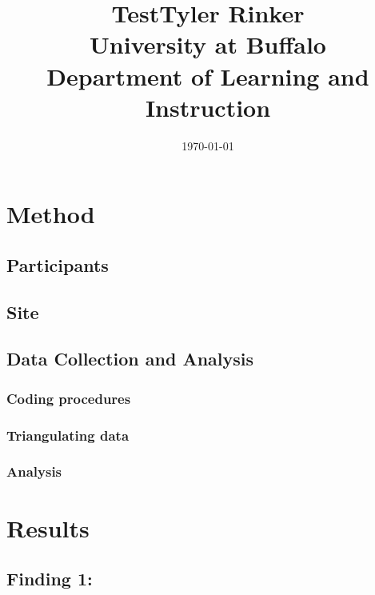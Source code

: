 



\title{Test}
\title{Tyler Rinker\\University at Buffalo\\Department of Learning and Instruction}
\date{\today} 
\maketitle

\section{Method}
\subsection{Participants}
\subsection{Site}
\subsection{Data Collection and Analysis}
\subsubsection{Coding procedures}
\subsubsection{Triangulating data}
\subsubsection{Analysis}

\section{Results}
\subsection{Finding 1:}
